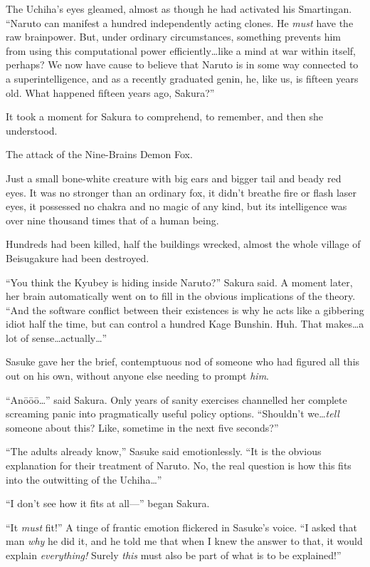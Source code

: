 The Uchiha’s eyes gleamed, almost as though he had activated his Smartingan. “Naruto can manifest a hundred independently acting clones. He \emph{must} have the raw brainpower. But, under ordinary circumstances, something prevents him from using this computational power efficiently…like a mind at war within itself, perhaps? We now have cause to believe that Naruto is in some way connected to a superintelligence, and as a recently graduated genin, he, like us, is fifteen years old. What happened fifteen years ago, Sakura?”

It took a moment for Sakura to comprehend, to remember, and then she understood.

The attack of the Nine-Brains Demon Fox.

Just a small bone-white creature with big ears and bigger tail and beady red eyes. It was no stronger than an ordinary fox, it didn’t breathe fire or flash laser eyes, it possessed no chakra and no magic of any kind, but its intelligence was over nine thousand times that of a human being.

Hundreds had been killed, half the buildings wrecked, almost the whole village of Beisugakure had been destroyed.

“You think the Kyubey is hiding inside Naruto?” Sakura said. A moment later, her brain automatically went on to fill in the obvious implications of the theory. “And the software conflict between their existences is why he acts like a gibbering idiot half the time, but can control a hundred Kage Bunshin. Huh. That makes…a lot of sense…actually…”

Sasuke gave her the brief, contemptuous nod of someone who had figured all this out on his own, without anyone else needing to prompt \emph{him}.

“Anōōō…” said Sakura. Only years of sanity exercises channelled her complete screaming panic into pragmatically useful policy options. “Shouldn’t we…\emph{tell} someone about this? Like, sometime in the next five seconds?”

“The adults already know,” Sasuke said emotionlessly. “It is the obvious explanation for their treatment of Naruto. No, the real question is how this fits into the outwitting of the Uchiha…”

“I don’t see how it fits at all—” began Sakura.

“It \emph{must} fit!” A tinge of frantic emotion flickered in Sasuke’s voice. “I asked that man \emph{why} he did it, and he told me that when I knew the answer to that, it would explain \emph{everything!} Surely \emph{this} must also be part of what is to be explained!”

